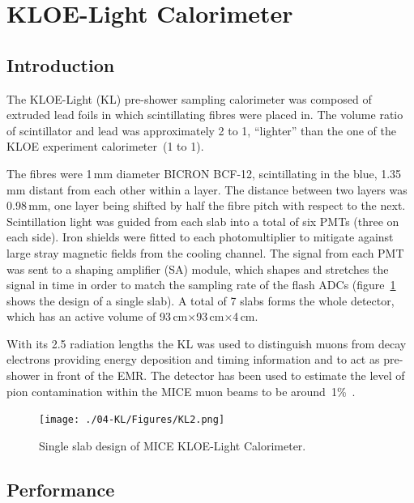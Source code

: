\graphicspath{{04-KL/Figures/}}

\section{KLOE-Light Calorimeter}
\label{Sect:KL}

\subsection{Introduction}
\label{SubSect:KL_Intro}

The KLOE-Light (KL) pre-shower sampling calorimeter was composed of extruded lead foils in which scintillating fibres were placed in. The volume ratio of scintillator and lead was approximately 2 to 1, ``lighter'' than the one of the KLOE experiment calorimeter~(1 to 1).

The fibres were 1\,mm diameter BICRON BCF-12, scintillating in the blue, 1.35\,mm distant from each other within a layer. The distance between two layers was 0.98\,mm, one layer being shifted by half the fibre pitch with respect to the next.
Scintillation light was guided from each slab into a total of six PMTs (three on each side). Iron shields were fitted to each photomultiplier to
mitigate against large stray magnetic fields from the cooling channel. The signal from each PMT was sent to a shaping amplifier (SA) module, which shapes and stretches the signal in time in order to match the sampling rate of the flash ADCs (figure~\ref{fig:KL2} shows the design of a single slab).
A total of 7 slabs forms the whole detector, which has an active volume of 93\,cm$\times$93\,cm$\times$4\,cm.

With its 2.5 radiation lengths the KL was used to distinguish muons from decay electrons providing energy deposition and timing information and to act as pre-shower in front of the EMR.
The detector has been used to estimate the level of pion contamination within the MICE muon beams to be around~1\%~\cite{2016JInst..11P3001A}.
\begin{figure}
  \begin{center}
    \texttt{[image: ./04-KL/Figures/KL2.png]}
    \caption{Single slab design of MICE KLOE-Light Calorimeter.}
    \label{fig:KL2}
  \end{center}
\end{figure}



\subsection{Performance}
\label{SubSect:KL_Performance}

